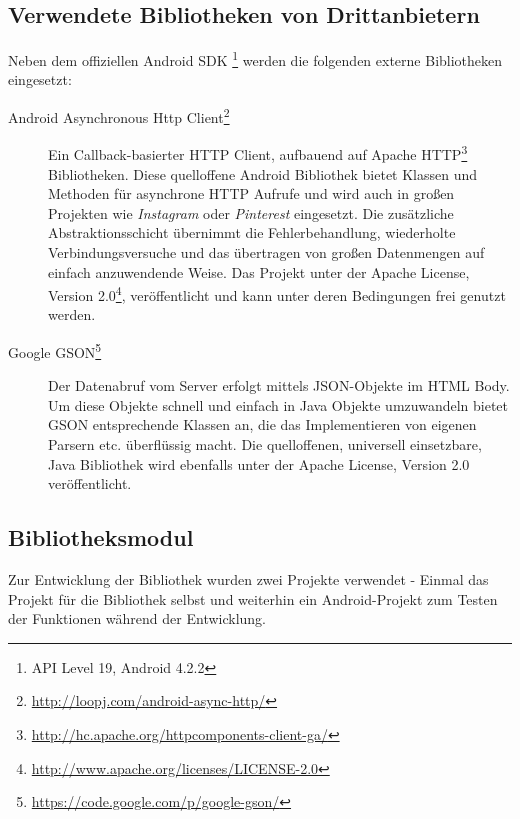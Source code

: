 \subsection{Verwendete Bibliotheken von Drittanbietern}
Neben dem offiziellen Android SDK \footnote{API Level 19, Android 4.2.2} werden die folgenden externe Bibliotheken eingesetzt:
\begin{description}
	\item[Android Asynchronous Http Client\footnote{\url{http://loopj.com/android-async-http/}}] 
	Ein Callback-basierter HTTP Client, aufbauend auf Apache HTTP\footnote{\url{http://hc.apache.org/httpcomponents-client-ga/}} Bibliotheken. Diese quelloffene Android Bibliothek bietet Klassen und Methoden für asynchrone HTTP Aufrufe und wird auch in großen Projekten wie \emph{Instagram} oder \emph{Pinterest} eingesetzt. Die zusätzliche Abstraktionsschicht übernimmt die Fehlerbehandlung, wiederholte Verbindungsversuche und das übertragen von großen Datenmengen auf einfach anzuwendende Weise. Das Projekt unter der Apache License, Version 2.0\footnote{\url{http://www.apache.org/licenses/LICENSE-2.0}}, veröffentlicht und kann unter deren Bedingungen frei genutzt werden.
	\item[Google GSON\footnote{\url{https://code.google.com/p/google-gson/}}]
	Der Datenabruf vom Server erfolgt mittels \ac{JSON}-Objekte im HTML Body. Um diese Objekte schnell und einfach in Java Objekte umzuwandeln bietet GSON entsprechende Klassen an, die das Implementieren von eigenen Parsern etc. überflüssig macht.
	Die quelloffenen, universell einsetzbare, Java Bibliothek wird ebenfalls unter der Apache License, Version 2.0 veröffentlicht.
\end{description}

\subsection{Bibliotheksmodul}
Zur Entwicklung der Bibliothek wurden zwei Projekte verwendet - Einmal das Projekt für die Bibliothek selbst und weiterhin ein Android-Projekt zum Testen der Funktionen während der Entwicklung. 

